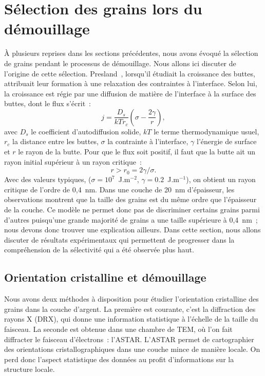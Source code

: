 \section{Sélection des grains lors du démouillage}
À plusieurs reprises dans les sections précédentes, nous avons évoqué la sélection de grains pendant le processus de démouillage. Nous allons ici discuter de l'origine de cette sélection. Presland~\cite{presland1972hillock}, lorsqu'il étudiait la croissance des buttes, attribuait leur formation à une relaxation des contraintes à l'interface. Selon lui, la croissance est régie par une diffusion de matière de l'interface à la surface des buttes, dont le flux s'écrit~:
\begin{equation}
j = \dfrac{D_s}{kTr_c}\left(\sigma-\dfrac{2\gamma}{r}\right),
\end{equation}
avec $D_s$ le coefficient d'autodiffusion solide, $kT$ le terme thermodynamique usuel, $r_c$ la distance entre les buttes, $\sigma$ la contrainte à l'interface, $\gamma$ l'énergie de surface et $r$ le rayon de la butte. Pour que le flux soit positif, il faut que la butte ait un rayon initial supérieur à un rayon critique~:
\begin{equation}
r > r_0 = 2\gamma/\sigma.
\end{equation}
Avec des valeurs typiques, ($\sigma = 10^{7}$~J.m$^{-2}$, $\gamma = 0.2$~J.m$^{-1}$), on obtient un rayon critique de l'ordre de 0,4~nm. Dans une couche de 20~nm d'épaisseur, les observations montrent que la taille des grains est du même ordre que l'épaisseur de la couche. Ce modèle ne permet donc pas de discriminer certains grains parmi d'autres puisqu'une grande majorité de grains a une taille supérieure à 0,4~nm~; nous devons donc trouver une explication ailleurs. Dans cette section, nous allons discuter de résultats expérimentaux qui permettent de progresser dans la compréhension de la sélectivité qui a été observée plus haut.\par


\subsection{Orientation cristalline et démouillage}
Nous avons deux méthodes à disposition pour étudier l'orientation cristalline des grains dans la couche d'argent. La première est courante, c'est la diffraction des rayons X (DRX), qui donne une information statistique à l'échelle de la taille du faisceau. La seconde est obtenue dans une chambre de TEM, où l'on fait diffracter le faisceau d'électrons~: l'ASTAR. L'ASTAR permet de cartographier des orientations cristallographiques dans une couche mince de manière locale. On perd donc l'aspect statistique des données au profit d'informations sur la structure locale.\par
